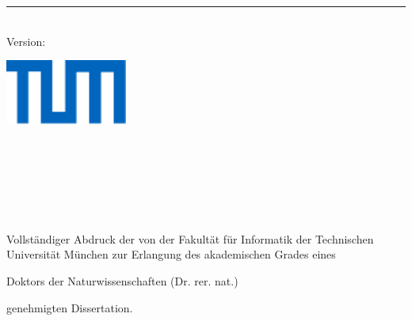 %
\begin{titlepage}
	\flushright
	\hfill
	\vfill
	{\LARGE\thesisTitle \par}
	\rule[5pt]{\textwidth}{.4pt} \par
	{\Large\thesisName}
	\vfill
	\textit{\large\thesisDate} \\
	Version: \thesisVersion
\end{titlepage}


\begin{titlepage}
	\tgherosfont
	\centering

	\includegraphics[width=4cm]{gfx/TUM_logo.pdf} \\[2mm]
	{\Large \thesisUniversity} \\
	\textsf{\thesisUniversityDepartment} \\
	\textsf{\thesisUniversityInstitute} \\
	\textsf{\thesisUniversityGroup} \\

	\vfill
	{\LARGE \color{ctcolortitle}\textbf{\thesisTitle} \\[10mm]}
	{\Large \thesisName} \\

	\vfill
	\begin{minipage}[t]{.95\textwidth}
		Vollständiger Abdruck der von der Fakultät für Informatik der Technischen Universität München zur Erlangung des akademischen Grades eines
		\begin{center}
			Doktors der Naturwissenschaften (Dr. rer. nat.)
			\end{center}
			genehmigten Dissertation.
	\end{minipage}
	
	\vspace{1cm}


\end{titlepage}
